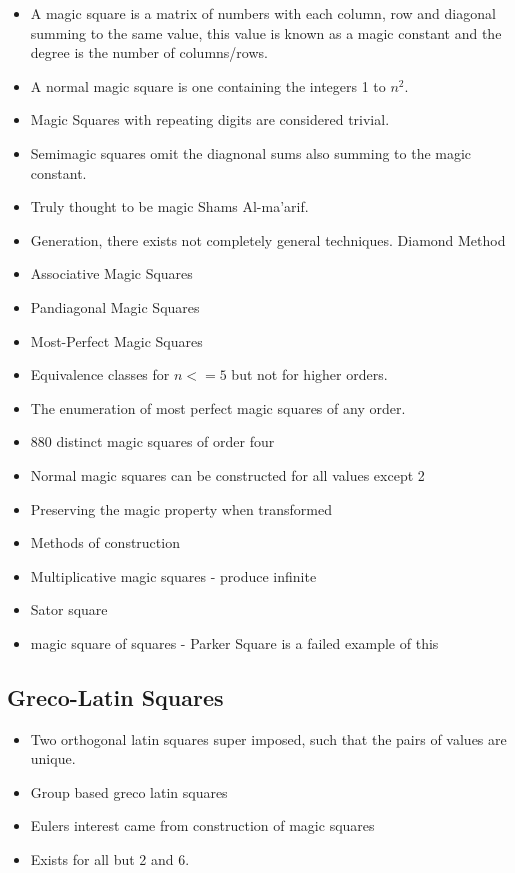 \documentclass[a4paper,12pt]{article}
\begin{document}
		\begin{itemize}
		\item{A magic square is a matrix of numbers with each column, row and diagonal summing to the same value, 
		this value is known as a magic constant and the degree is the number of columns/rows.}
		\item{A normal magic square is one containing the integers 1 to $n^2$.}
		\item{Magic Squares with repeating digits are considered trivial.}
		\item{Semimagic squares omit the diagnonal sums also summing to the magic constant.}
		\item{Truly thought to be magic Shams Al-ma'arif.}
		\item{Generation, there exists not completely general techniques. Diamond Method}
		\item{Associative Magic Squares}
		\item{Pandiagonal Magic Squares}
		\item{Most-Perfect Magic Squares}
		\item{Equivalence classes for $n<=5$ but not for higher orders.}
		\item{The enumeration of most perfect magic squares of any order.}
		\item{880 distinct magic squares of order four}
		\item{Normal magic squares can be constructed for all values except 2}
		\item{Preserving the magic property when transformed}
		\item{Methods of construction}
		\item{Multiplicative magic squares - produce infinite}
		\item{Sator square}
		\item{magic square of squares - Parker Square is a failed example of this}
		\end{itemize}
	
	\subsection{Greco-Latin Squares}

		\begin{itemize}
		\item{Two orthogonal latin squares super imposed, such that the pairs of values are unique.}
		\item{Group based greco latin squares}
		\item{Eulers interest came from construction of magic squares}
		\item{Exists for all but 2 and 6.}
		\end{itemize}
\end{document}
